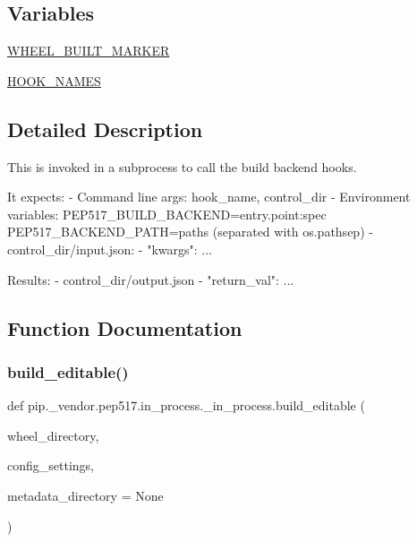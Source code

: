 \subsection*{Variables}
\begin{DoxyCompactItemize}
\item 
\hyperlink{namespacepip_1_1__vendor_1_1pep517_1_1in__process_1_1__in__process_afbba219e2b44f8a28d6c519f0d64b2b6}{W\+H\+E\+E\+L\+\_\+\+B\+U\+I\+L\+T\+\_\+\+M\+A\+R\+K\+ER}
\item 
\hyperlink{namespacepip_1_1__vendor_1_1pep517_1_1in__process_1_1__in__process_a45522484902bbab4ec054b2be2b5c501}{H\+O\+O\+K\+\_\+\+N\+A\+M\+ES}
\end{DoxyCompactItemize}


\subsection{Detailed Description}
\begin{DoxyVerb}This is invoked in a subprocess to call the build backend hooks.

It expects:
- Command line args: hook_name, control_dir
- Environment variables:
  PEP517_BUILD_BACKEND=entry.point:spec
  PEP517_BACKEND_PATH=paths (separated with os.pathsep)
- control_dir/input.json:
  - {"kwargs": {...}}

Results:
- control_dir/output.json
  - {"return_val": ...}
\end{DoxyVerb}
 

\subsection{Function Documentation}
\mbox{\label{namespacepip_1_1__vendor_1_1pep517_1_1in__process_1_1__in__process_a1f230783addb0a5913e9b10082c99eae}} 
\subsubsection{\texorpdfstring{build\+\_\+editable()}{build\_editable()}}
{\footnotesize\ttfamily def pip.\+\_\+vendor.\+pep517.\+in\+\_\+process.\+\_\+in\+\_\+process.\+build\+\_\+editable (\begin{DoxyParamCaption}\item[{}]{wheel\+\_\+directory,  }\item[{}]{config\+\_\+settings,  }\item[{}]{metadata\+\_\+directory = {\ttfamily None} }\end{DoxyParamCaption})}

